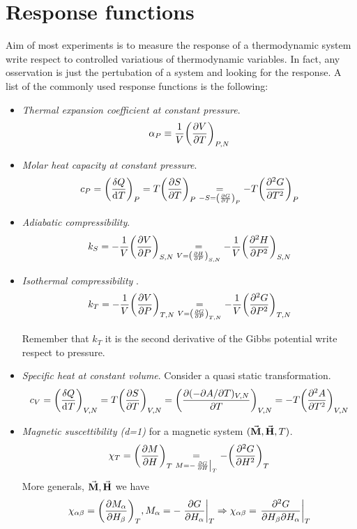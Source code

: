 \documentclass[../main/main.tex]{subfiles}
\begin{document}
\section{Response functions}
Aim of most experiments is to measure the response of a thermodynamic system write respect to controlled variatious of thermodynamic variables. In fact, any osservation is just the pertubation of a system and looking for the response.
A list of the commonly used response functions is the following:
\begin{itemize}
\item \emph{Thermal expansion coefficient at constant pressure}.
\begin{equation}
  \alpha _P \equiv \frac{1}{V} \qty(\pdv{V}{T} )_{P,N}
  \label{eq:}
\end{equation}
\item \emph{Molar heat capacity at constant pressure}.
\begin{equation}
  c_P = \qty(\frac{\delta Q}{\dd[]{T} } )_P = T \qty(\pdv{S}{T} )_P \underset{-S=\qty(\pdv{G}{T} )_P }{=}  - T \qty(\pdv[2]{G}{T} )_P
  \label{eq:}
\end{equation}
\item \emph{Adiabatic compressibility}.
\begin{equation}
  k_S = -\frac{1}{V} \qty(\pdv{V}{P} )_{S,N} \underset{V=\qty(\pdv{H}{P} )_{S,N} }{=} - \frac{1}{V} \qty(\pdv[2]{H}{P} )_{S,N}
    \label{eq:}
\end{equation}
\item \emph{Isothermal compressibility} .
\begin{equation}
  k_T = -\frac{1}{V} \qty(\pdv{V}{P} )_{T,N} \underset{V=\qty(\pdv{G}{P} )_{T,N} }{=} - \frac{1}{V} \qty(\pdv[2]{G}{P} )_{T,N}
  \label{eq:}
\end{equation}
\begin{remark}
Remember that \( k_T \) it is the second derivative of the Gibbs potential write respect to pressure.
\end{remark}
\item \emph{Specific heat at constant volume}. Consider a quasi static transformation.
\begin{equation}
  c_V =  \qty(\frac{\delta Q}{\dd[]{T} } )_{V,N} = T \qty(\pdv{S}{T} )_{V,N}
      = \qty( \frac{\partial{(-\partial{A}/\partial{T} )_{V,N}} }{\partial{T} })_{V,N}
      = - T \qty(\pdv[2]{A}{T} )_{V,N}
  \label{eq:}
\end{equation}
\item \emph{Magnetic suscettibility (d=1)} for a magnetic system \( (\va{M},\va{H},T  ) \).
\begin{equation}
  \chi_T = \qty(\pdv{M}{H} )_T \underset{M = -\eval{\pdv{G}{H}}_T }{=}  - \qty(\pdv[2]{G}{H} )_T
  \label{eq:}
\end{equation}
More generals, \( \va{M},\va{H}   \) we have
\begin{equation}
  \chi _{\alpha \beta } = \qty(\pdv{M_ \alpha }{H_ \beta } )_T , M_ \alpha = -\eval{\pdv{G}{H_ \alpha }}_T \Rightarrow \chi _{\alpha \beta } = \eval{\pdv{G}{H_ \beta }{H_ \alpha }}_T
  \label{eq:}
\end{equation}

\end{itemize}
\end{document}

